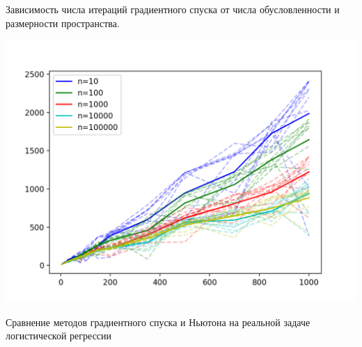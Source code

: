 \documentclass{article}
\theoremstyle{definition}
\theoremstyle{remark}
\begin{document}
Зависимость числа итераций градиентного спуска от числа обусловленности и размерности пространства.

\includegraphics[width=1 \textwidth]{21.png}

Сравнение методов градиентного спуска и Ньютона на реальной задаче логистической регрессии
\end{document}
